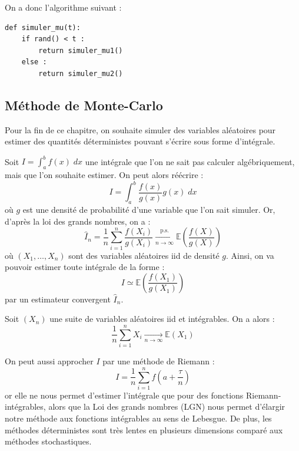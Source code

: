\begin{proposition}
    On a donc l'algorithme suivant :
    \begin{lstlisting}
def simuler_mu(t): 
    if rand() < t :
        return simuler_mu1()
    else : 
        return simuler_mu2()
    \end{lstlisting}
\end{proposition}

\subsection{Méthode de Monte-Carlo}

Pour la fin de ce chapitre, on souhaite simuler des variables aléatoires pour estimer des quantités déterministes 
pouvant s'écrire sous forme d'intégrale. 

\begin{proposition}
    Soit $I = \int_{a}^{b} f(x) \; dx$ une intégrale que l'on ne sait pas calculer algébriquement, 
    mais que l'on souhaite estimer. On peut alors réécrire : 
        $$ I = \int_{a}^{b} \frac{f(x)}{g(x)} g(x) \; dx $$ 
    où $g$ est une densité de probabilité d'une variable que l'on sait simuler. Or, d'après la loi des grands nombres, on a :
        $$ \hat{I}_n = \frac{1}{n} \sum_{i=1}^{n} \frac{f(X_i)}{g(X_i)} \underset{ n \to \infty}{\xrightarrow{ \text{p.s.} }} \mathbb{E} \left( \frac{f(X)}{g(X)} \right) $$ 
    où $(X_1, \dots, X_n)$ sont des variables aléatoires iid de densité $g$. Ainsi, on va pouvoir estimer toute intégrale de 
    la forme : 
        $$ I \simeq \mathbb{E} \left( \frac{f(X_1)}{g(X_1)} \right) $$ 
    par un estimateur convergent $ \hat{I}_n$. 
\end{proposition}

\begin{theorem}
    Soit $(X_n)$ une suite de variables aléatoires iid et intégrables. On a alors : 
        $$ \boxed{\frac{1}{n} \sum_{i=1}^{n} X_i \underset{n \to \infty}{\longrightarrow} \mathbb{E}(X_1)} $$   
\end{theorem}

\begin{remark}
    On peut aussi approcher $I$ par une méthode de Riemann : 
        $$ I = \frac{1}{n} \sum_{i=1}^{n} f \left(a + \frac{ \tau}{n} \right) $$ 
    or elle ne nous permet d'estimer l'intégrale que pour des fonctions Riemann-intégrables, alors que la 
    Loi des grands nombres (LGN) nous permet d'élargir notre méthode aux fonctions intégrables au sens 
    de Lebesgue. De plus, les méthodes déterministes sont très lentes en plusieurs dimensions 
    comparé aux méthodes stochastiques.
\end{remark}


